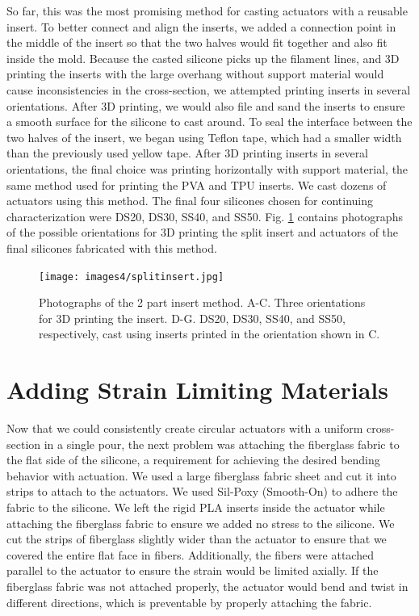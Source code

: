 So far, this was the most promising method for casting actuators with a reusable insert. To better connect and align the inserts, we added a connection point in the middle of the insert so that the two halves would fit together and also fit inside the mold. Because the casted silicone picks up the filament lines, and 3D printing the inserts with the large overhang without support material would cause inconsistencies in the cross-section, we attempted printing inserts in several orientations. After 3D printing, we would also file and sand the inserts to ensure a smooth surface for the silicone to cast around. To seal the interface between the two halves of the insert, we began using Teflon tape, which had a smaller width than the previously used yellow tape. After 3D printing inserts in several orientations, the final choice was printing horizontally with support material, the same method used for printing the PVA and TPU inserts. We cast dozens of actuators using this method. The final four silicones chosen for continuing characterization were DS20, DS30, SS40, and SS50. Fig. \ref{fig:splitinsert} contains photographs of the possible orientations for 3D printing the split insert and actuators of the final silicones fabricated with this method. 

\begin{figure}[h!]
    \centering
    \texttt{[image: images4/splitinsert.jpg]}
    \caption{Photographs of the 2 part insert method. A-C. Three orientations for 3D printing the insert. D-G. DS20, DS30, SS40, and SS50, respectively, cast using inserts printed in the orientation shown in C.}
    \label{fig:splitinsert}
\end{figure}

\clearpage
\section{Adding Strain Limiting Materials}
Now that we could consistently create circular actuators with a uniform cross-section in a single pour, the next problem was attaching the fiberglass fabric to the flat side of the silicone, a requirement for achieving the desired bending behavior with actuation. We used a large fiberglass fabric sheet and cut it into strips to attach to the actuators. We used Sil-Poxy (Smooth-On) to adhere the fabric to the silicone. We left the rigid PLA inserts inside the actuator while attaching the fiberglass fabric to ensure we added no stress to the silicone. We cut the strips of fiberglass slightly wider than the actuator to ensure that we covered the entire flat face in fibers. Additionally, the fibers were attached parallel to the actuator to ensure the strain would be limited axially. If the fiberglass fabric was not attached properly, the actuator would bend and twist in different directions, which is preventable by properly attaching the fabric. 

